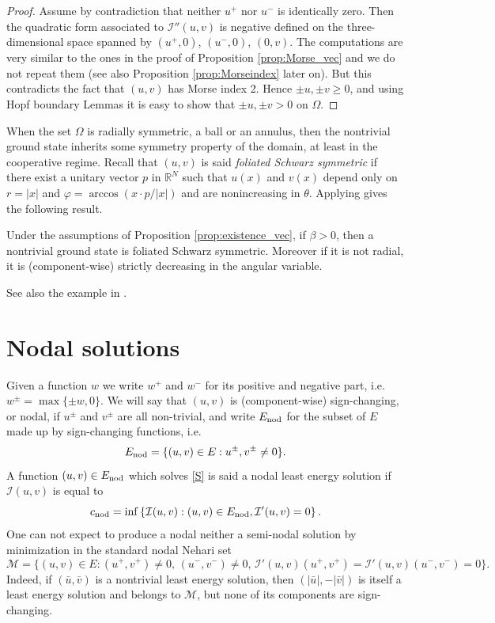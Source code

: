 \documentclass[reqno]{amsart}
\begin{document}
\begin{proof}
Assume by contradiction that neither $u^+$ nor $u^-$ is identically zero.
Then the quadratic form associated to $\mathcal I''(u,v)$ is negative defined on
the three-dimensional space spanned by $(u^+, 0)$, $(u^-, 0)$, $(0,v)$.
The computations are very similar to the ones in the proof of Proposition
\ref{prop:Morse_vec} and we do not repeat them (see also Proposition
\ref{prop:Morseindex} later on). But this contradicts the fact that $(u,v)$ has
Morse index 2.
Hence $\pm u, \pm v \ge 0$, and using Hopf boundary Lemmas it is easy to show that
$\pm u, \pm v >0$  on $\Omega$.
\end{proof}

When the set  $\Omega$ is radially symmetric, a ball or an annulus, then the
nontrivial ground state inherits some symmetry property of the domain, at least in
the cooperative regime.
Recall that $(u,v)$ is said \emph{foliated Schwarz symmetric} if there exist a
unitary vector $p$ in $\mathbb{R}^N$ such that $u(x)$ and $v(x)$ depend only on $r = |x|$ and
$\varphi = \arccos (x\cdot p /|x|)$ and are nonincreasing in $\theta$.
Applying \cite[Theorem 1.1]{DamPac} gives the following result.

\begin{corollary}\label{cor:foliated}
Under the assumptions of Proposition \ref{prop:existence_vec}, if $\beta > 0$,
then a  nontrivial ground state is  foliated Schwarz symmetric.
Moreover if it is not radial, it is (component-wise) strictly decreasing in the
angular variable.
\end{corollary}

See also the example in \cite[Section 4]{DamPac}.

\section{Nodal solutions}\label{sec2}

Given a function $w$ we write $w^+$ and $w^-$ for its positive and negative part,
i.e. $w^{\pm}=\max\{\pm w, 0\}$.
We will say that $(u,v)$ is  (component-wise) sign-changing, or nodal,
if $u^{\pm}$ and $v^{\pm}$ are all non-trivial, and
write $E_{\rm nod}$ for the subset of $E$ made up by sign-changing functions, i.e.
\[
E_{\rm nod} = \{(u,v) \in E : u^{\pm},v^{\pm}\neq0\}.
\]
A function $(u,v)\in E_{\rm nod}$ which solves \eqref{S} is said a nodal least energy
solution if $\mathcal I(u,v)$ is equal to
\[
c_{\rm nod}= \inf \left\{ \mathcal I(u,v) : (u,v)\in E_{\rm nod},
 \mathcal I'(u,v) =0\right\}.
\]
One can not expect to produce a nodal neither a semi-nodal  solution by minimization
in the  standard nodal Nehari set
\[
\mathcal M = \{ (u,v)\in E : (u^+,v^+)\neq 0, \, (u^-,v^-)\neq 0, \,
 \mathcal I'(u,v)(u^+,v^+)= \mathcal I'(u,v) (u^- ,v^-)=0\} .
 \]
Indeed, if $(\bar u, \bar v)$ is a nontrivial least energy solution, then
$(|\bar u| , -|\bar v|)$ is itself a least energy solution and belongs  to $\mathcal M$,
but none of  its components are sign-changing.
\end{document}
